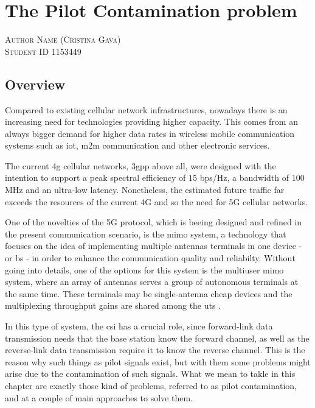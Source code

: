 \documentclass[11pt]{book}
\makeatletter
\newcommand{\chapterauthor}[1]{%
  {\parindent0pt\vspace*{-25pt}%
  \linespread{1.1} \scshape#1%
  \par\nobreak\vspace*{35pt}}
  \@afterheading%
}
\makeatother
\begin{document}

\chapter{The Pilot Contamination problem}
\chapterauthor{Author Name (Cristina Gava)\\
Student ID 1153449}

\section{Overview}
Compared to existing cellular network infrastructures, nowadays there is an increasing need for technologies providing higher capacity. This comes from an always bigger demand for higher data rates in wireless mobile communication systems such as \gls{iot}, \gls{m2m} communication and other electronic services.

The current \gls{4g} cellular networks, \gls{3gpp} above all, were designed with the intention to support a peak spectral efficiency of $15$ bps/Hz, a bandwidth of $100$ MHz and an ultra-low latency. Nonetheless, the estimated future traffic far exceeds the resources of the current 4G and so the need for 5G cellular networks.

One of the novelties of the 5G protocol, which is beeing designed and refined in the present communication scenario, is the \gls{mimo} system, a technology that focuses on the idea of implementing multiple antennas terminals in one device - or \gls{bs} - in order to enhance the communication quality and reliabilty. Without going into details, one of the options for this system is the multiuser \gls{mimo} system, where an array of antennas serves a group of autonomous terminals at the same time. These terminals may be single-antenna cheap devices and the multiplexing throughput gains are shared among the \gls{ut}s \cite{Marzetta2010} \cite{Elijah2016}.

In this type of system, the \gls{csi} has a crucial role, since forward-link data transmission needs that the base station know the forward channel, as well as the reverse-link data transmission require it to know the reverse channel. This is the reason why such things as pilot signals exist, but with them some problems might arise due to the contamination of such signals. What we mean to takle in this chapter are exactly those kind of problems, referred to as pilot contamination, and at a couple of main approaches to solve them.
\end{document}
